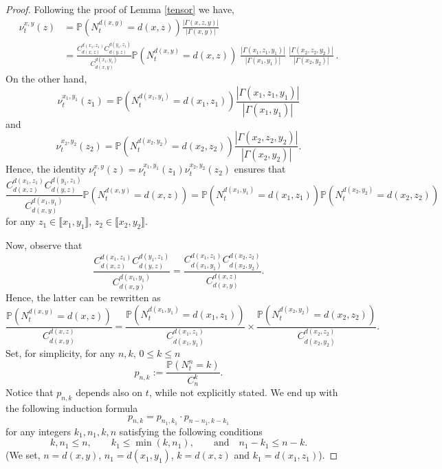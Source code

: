 \documentclass[11pt]{amsart}
\numberwithin{equation}{section}
\begin{document}
\begin{proof}
Following the proof of Lemma \ref{tensor} we have,
\begin{align*}
\nu_t^{x,y}(z) & = {\mathbb{P}}\left( N_t^{d(x,y)} = d(x,z) \right) \frac{|\Gamma(x,z,y) |} {| \Gamma(x,y)|}   \\
& = 
\frac{C_{d(x,z)}^{d(x_1,z_1)} C_{d(y,z)}^{d(y_1,z_1)} } {C_{d(x,y)}^{d(x_1,y_1)}} {\mathbb{P}}\left( N_t^{d(x,y)} = d(x,z) \right) 
\;
 \frac{| \Gamma(x_1,z_1,y_1) |} {| \Gamma(x_1,y_1)|} 
\;
 \frac{| \Gamma(x_2,z_2,y_2) |} {| \Gamma(x_2,y_2)|} \,.
\end{align*}
On the other hand,
$$
\nu^{x_1,y_1}_t(z_1) =  {\mathbb{P}}\left( N_t^{d(x_1,y_1)} = d(x_1,z_1) \right) \frac{| \Gamma(x_1,z_1,y_1) |} {| \Gamma(x_1,y_1)|} 
$$
and
$$
\nu^{x_2,y_2}_t(z_2) =  {\mathbb{P}}\left( N_t^{d(x_2,y_2)} = d(x_2,z_2) \right) \frac{| \Gamma(x_2,z_2,y_2)| } {| \Gamma(x_2,y_2)|} 
.
$$
Hence, the identity $\nu^{x,y}_t(z)=\nu^{x_1,y_1}_t(z_1)\nu^{x_2,y_2}_t(z_2)$ ensures that
$$
\frac{C_{d(x,z)}^{d(x_1,z_1)} C_{d(y,z)}^{d(y_1,z_1)} } {C_{d(x,y)}^{d(x_1,y_1)}} {\mathbb{P}}\left( N_t^{d(x,y)} = d(x,z) \right) 
=
{\mathbb{P}}\left( N_t^{d(x_1,y_1)} = d(x_1,z_1) \right) {\mathbb{P}}\left( N_t^{d(x_2,y_2)} = d(x_2,z_2) \right)
$$
for any $z_1\in \llbracket x_1,y_1\rrbracket$, $z_2\in \llbracket x_2,y_2\rrbracket$.

Now, observe that
$$
\frac{C_{d(x,z)}^{d(x_1,z_1)} C_{d(y,z)}^{d(y_1,z_1)} } {C_{d(x,y)}^{d(x_1,y_1)}}
=
\frac{ C_{d(x_1,y_1)}^{d(x_1,z_1)} C_{d(x_2,y_2)}^{d(x_2,z_2)}}{C_{d(x,y)}^{d(x,z)}} .
$$
Hence, the latter can be rewritten as
$$
\frac{{\mathbb{P}}\left( N_t^{d(x,y)} = d(x,z) \right)}{C_{d(x,y)}^{d(x,z)}}
=
\frac{{\mathbb{P}}\left( N_t^{d(x_1,y_1)} = d(x_1,z_1) \right)}{C_{d(x_1,y_1)}^{d(x_1,z_1)}} 
\times 
\frac{ {\mathbb{P}}\left( N_t^{d(x_2,y_2)} = d(x_2,z_2) \right)}{C_{d(x_2,y_2)}^{d(x_2,z_2)}} .
$$
Set, for simplicity, for any $n,k$, $0 \leq k \leq n$
$$
p_{n,k} := \frac{{\mathbb{P}}\left( N_t^{n} = k \right)}{C_n^k} .
$$
Notice that $p_{n,k}$ depends also on $t$, while not explicitly stated.
We end up with the following induction formula
\begin{equation} \label{induction}
p_{n,k} = p_{n_1,k_1} \cdot  p_{n-n_1,k-k_1}
\end{equation}
for any integers $k_1,n_1, k,n$ satisfying the following conditions
$$
 k,n_1 \leq n, \qquad k_1 \leq \min(k,n_1), \qquad \mbox{and} \quad n_1-k_1 \leq n-k .
$$
(We set, $n=d(x,y)$, $n_1=d(x_1,y_1)$, $k=d(x,z)$ and $k_1=d(x_1,z_1)$).


\end{proof}
\end{document}
